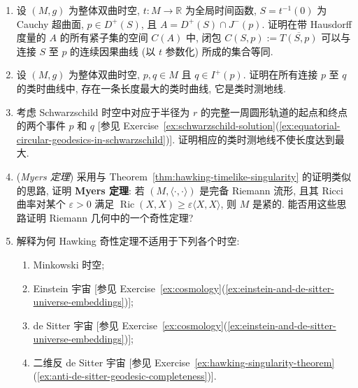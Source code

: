 \begin{RiemannExercise}
\begin{enumerate}[label=(\arabic*),ref=\arabic*,leftmargin=*]
证明 Corollary~\ref{cor:closed-causal-futures-and-compact-diamonds}.
\item\label{ex:hausdorff-closure-of-timelike-curves}
设 $(M,g)$ 为整体双曲时空, $t:M\to\mathbb{R}$ 为全局时间函数, $S=t^{-1}(0)$ 为 Cauchy 超曲面, $p\in D^+(S)$, 且 $A=D^+(S)\cap J^-(p)$. 证明在带 Hausdorff 度量的 $A$ 的所有紧子集的空间 $C(A)$ 中, 闭包 $C(S,p):=\overline{T(S,p)}$ 可以与连接 $S$ 至 $p$ 的连续因果曲线 (以 $t$ 参数化) 所成的集合等同.
\item\label{ex:maximal-timelike-geodesic-between-two-events}
设 $(M,g)$ 为整体双曲时空, $p,q\in M$ 且 $q\in I^+(p)$. 证明在所有连接 $p$ 至 $q$ 的类时曲线中, 存在一条长度最大的类时曲线, 它是类时测地线.
\item\label{ex:nonmaximal-circular-orbit-around-schwarzschild-mass}
考虑 Schwarzschild 时空中对应于半径为 $r$ 的完整一周圆形轨道的起点和终点的两个事件 $p$ 和 $q$ [参见 Exercise~\ref{ex:schwarzschild-solution}(\ref{ex:equatorial-circular-geodesics-in-schwarzschild})]. 证明相应的类时测地线不使长度达到最大.
\item\label{ex:myers-compactness-under-positive-ricci-curvature}
(\emph{Myers 定理}) 采用与 Theorem~\ref{thm:hawking-timelike-singularity} 的证明类似的思路, 证明 \textbf{Myers 定理}: 若 $(M,\langle\cdot,\cdot\rangle)$ 是完备 Riemann 流形, 且其 Ricci 曲率对某个 $\varepsilon>0$ 满足 $\operatorname{Ric}(X,X)\geq\varepsilon\langle X,X\rangle$, 则 $M$ 是紧的. 能否用这些思路证明 Riemann 几何中的一个奇性定理?
\item\label{ex:limits-of-hawking-singularity-theorem}
解释为何 Hawking 奇性定理不适用于下列各个时空:
\begin{enumerate}[label=(\alph*),leftmargin=*]
\item Minkowski 时空;
\item Einstein 宇宙 [参见 Exercise~\ref{ex:cosmology}(\ref{ex:einstein-and-de-sitter-universe-embeddings})];
\item de Sitter 宇宙 [参见 Exercise~\ref{ex:cosmology}(\ref{ex:einstein-and-de-sitter-universe-embeddings})];
\item {}\label{idx:hawking-example-anti-de-sitter}二维反 de Sitter 宇宙 [参见 Exercise~\ref{ex:hawking-singularity-theorem}(\ref{ex:anti-de-sitter-geodesic-completeness})].
\end{enumerate}
\end{enumerate}
\end{RiemannExercise}
